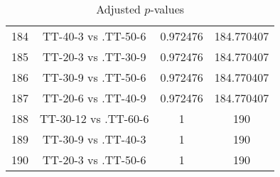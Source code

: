\documentclass[a4paper,10pt]{article}
\begin{document}
\begin{landscape}
\begin{table}[!htp]
\begin{tabular}{cccc}
184&TT-40-3 vs .TT-50-6&0.972476&184.770407\\
185&TT-20-3 vs .TT-30-9&0.972476&184.770407\\
186&TT-30-9 vs .TT-50-6&0.972476&184.770407\\
187&TT-20-6 vs .TT-40-9&0.972476&184.770407\\
188&TT-30-12 vs .TT-60-6&1&190\\
189&TT-30-9 vs .TT-40-3&1&190\\
190&TT-20-3 vs .TT-50-6&1&190\\
\hline
\end{tabular}
\caption{Adjusted $p$-values}
\end{table}

\end{landscape}
\end{document}

